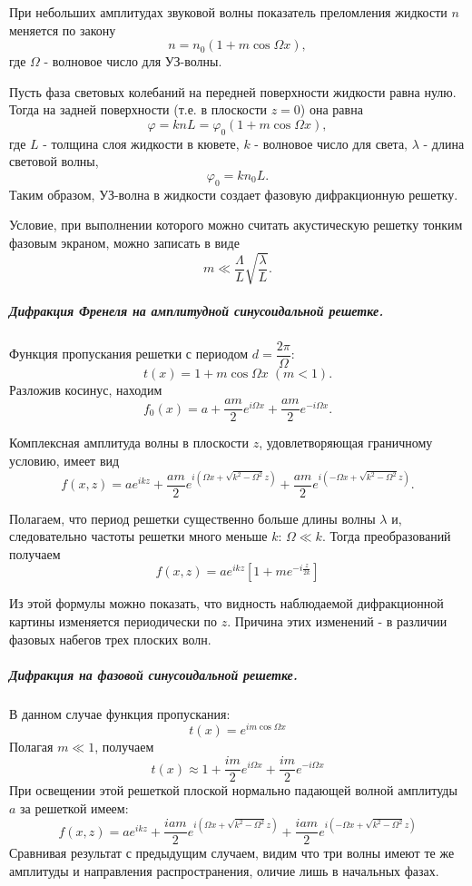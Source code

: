\documentclass[12pt]{article}
\renewcommand{\phi}{\ensuremath{\varphi}}
\begin{document}
		 При небольших амплитудах звуковой волны показатель преломления жидкости $n$ меняется по закону $$n = n_0(1+m\cos\Omega x),$$
		 где $\Omega$ - волновое число для УЗ-волны.
		 
		 Пусть фаза световых колебаний на передней поверхности жидкости равна нулю. Тогда на задней поверхности (т.е. в плоскости $z = 0$) она равна 
		 $$\phi = knL = \phi_0(1 + m\cos \Omega x),$$
		 где $L$ - толщина слоя жидкости в кювете, $k$ - волновое число для света, $\lambda$ - длина световой волны, $$\phi_0 = kn_0L.$$ Таким образом, УЗ-волна в жидкости создает фазовую дифракционную решетку.
		 
		 Условие, при выполнении которого можно считать акустическую решетку тонким фазовым экраном, можно записать в виде $$m \ll \dfrac{\Lambda}{L}\sqrt{\dfrac{\lambda}{L}}.$$
		 
		 \subparagraph{Дифракция Френеля на амплитудной синусоидальной решетке.}
		 Функция пропускания решетки с периодом $d = \dfrac{2\pi}{\Omega}$:
		 $$t(x) = 1 + m\cos\Omega x \;(m < 1).$$
		 Разложив косинус, находим 
		$$f_0(x) = a + \dfrac{am}{2}e^{i\Omega x} + \dfrac{am}{2}e^{-i\Omega x}.$$
		
		Комплексная амплитуда волны в плоскости $z$, удовлетворяющая граничному условию, имеет вид 
		$$f(x,z) = ae^{ikz} + \dfrac{am}{2}e^{i(\Omega x + \sqrt{k^2 - \Omega^2}z)} + \dfrac{am}{2}e^{i(-\Omega x + \sqrt{k^2 - \Omega^2}z)} .$$
		
		Полагаем, что период решетки существенно больше длины волны $\lambda$ и, следовательно частоты решетки много меньше $k$: $\Omega \ll k$. Тогда преобразований получаем 
		$$f(x,z) = ae^{ikz}\left[1 + me^{-i\frac{z}{2k}}\right]$$
		
		Из этой формулы можно показать, что видность наблюдаемой дифракционной картины изменяется периодически по $z$. Причина этих изменений - в различии фазовых набегов трех плоских волн.
		
		\subparagraph{Дифракция на фазовой синусоидальной решетке. }
		
		В данном случае функция пропускания: $$t(x) = e^{im\cos \Omega x}$$
		Полагая $m \ll 1$, получаем $$t(x) \approx 1 + \dfrac{im}{2}e^{i\Omega x} + \dfrac{im}{2}e^{-i\Omega x}$$
		При освещении этой решеткой плоской нормально падающей волной амплитуды $a$ за решеткой имеем: $$f(x,z) = ae^{ikz} + \dfrac{iam}{2}e^{i(\Omega x + \sqrt{k^2 - \Omega ^2}z)} + \dfrac{iam}{2}e^{i(-\Omega x + \sqrt{k^2 - \Omega ^2}z)}$$
		Сравнивая результат с предыдущим случаем, видим что три волны имеют те же амплитуды и направления распространения, оличие лишь в начальных фазах.
		
\end{document}
